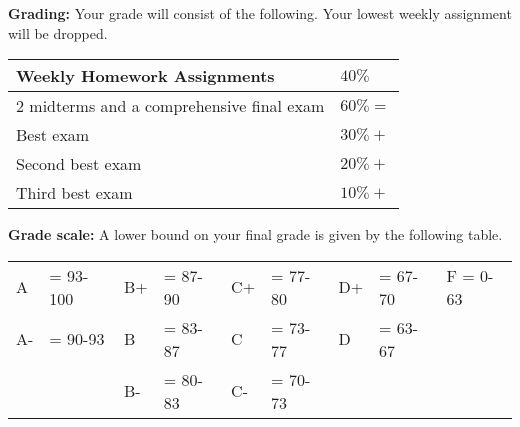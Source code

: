 \documentclass[12pt]{article}
\begin{document}
\noindent\begin{minipage}{\textwidth}
\noindent\textbf{Grading:}
Your grade will consist of the following. Your lowest weekly assignment will be dropped.

\begin{center}
 \begin{tabular}{|l|l|}
 \hline
 Weekly Homework Assignments & $40\%$ \\
 \hline
 2 midterms and a comprehensive final exam & $60\% = $ 	 \\
 Best exam & $30\% + $ 	 \\
 Second best exam& $20\% + $ 	 \\
 Third best exam & $10\% + $ 	 \\
 \hline
 \end{tabular}
\end{center}
\end{minipage}

\vspace*{.15in}
\noindent\textbf{Grade scale:}
A lower bound on your final grade is given by the following table.

\begin{center}
 \begin{tabular}{|ll|ll|ll|ll|l|}
\hline
A &\hspace{-3 pt}\hspace{-7 pt}= 93-100 &B+ &\hspace{-7 pt}= 87-90 &C+ &\hspace{-7 pt}= 77-80 & D+ &\hspace{-7 pt}= 67-70 & F = 0-63\\
A- &\hspace{-3 pt}\hspace{-7 pt}= 90-93 &B &\hspace{-7 pt}= 83-87 & C &\hspace{-7 pt}= 73-77 & D &\hspace{-7 pt}= 63-67 &\\
 & &B- &\hspace{-7 pt}= 80-83 &C- &\hspace{-7 pt}= 70-73 & & &\\
 \hline
 \end{tabular}
\end{center}
\end{document}
